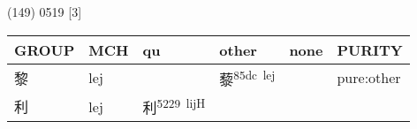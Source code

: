 \documentclass[14pt,a4paper]{scrartcl}
\begin{document}
(149) 0519 {[}3{]}

\begin{longtable}[c]{@{}llllll@{}}
\toprule
\begin{minipage}[b]{0.14\columnwidth}\raggedright\strut
GROUP
\strut\end{minipage} &
\begin{minipage}[b]{0.14\columnwidth}\raggedright\strut
MCH
\strut\end{minipage} &
\begin{minipage}[b]{0.14\columnwidth}\raggedright\strut
qu
\strut\end{minipage} &
\begin{minipage}[b]{0.14\columnwidth}\raggedright\strut
other
\strut\end{minipage} &
\begin{minipage}[b]{0.14\columnwidth}\raggedright\strut
none
\strut\end{minipage} &
\begin{minipage}[b]{0.14\columnwidth}\raggedright\strut
PURITY
\strut\end{minipage}\tabularnewline
\midrule
\endhead
\begin{minipage}[t]{0.14\columnwidth}\raggedright\strut
黎
\strut\end{minipage} &
\begin{minipage}[t]{0.14\columnwidth}\raggedright\strut
lej
\strut\end{minipage} &
\begin{minipage}[t]{0.14\columnwidth}\raggedright\strut
\strut\end{minipage} &
\begin{minipage}[t]{0.14\columnwidth}\raggedright\strut
藜\textsuperscript{85dc~lej}
\strut\end{minipage} &
\begin{minipage}[t]{0.14\columnwidth}\raggedright\strut
\strut\end{minipage} &
\begin{minipage}[t]{0.14\columnwidth}\raggedright\strut
pure:other
\strut\end{minipage}\tabularnewline
\begin{minipage}[t]{0.14\columnwidth}\raggedright\strut
利
\strut\end{minipage} &
\begin{minipage}[t]{0.14\columnwidth}\raggedright\strut
lej
\strut\end{minipage} &
\begin{minipage}[t]{0.14\columnwidth}\raggedright\strut
利\textsuperscript{5229~lijH}

\end{minipage}
\end{longtable}
\end{document}
